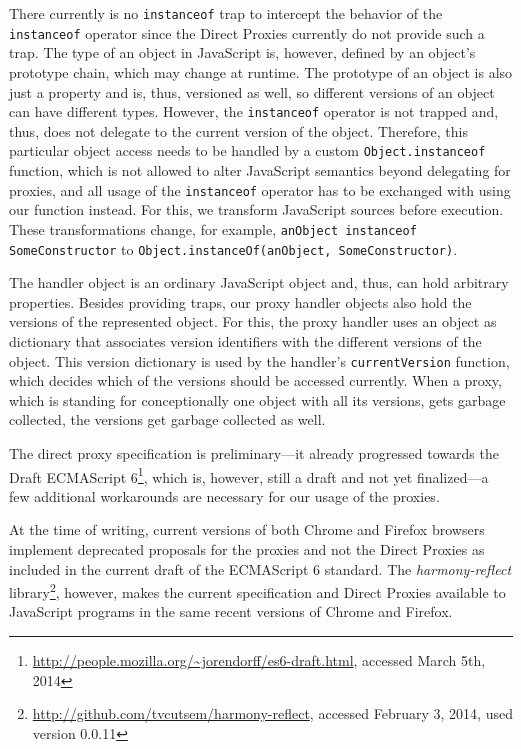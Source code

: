 There currently is no \lstinline{instanceof} trap to intercept the behavior of the \lstinline{instanceof} operator since the Direct Proxies currently do not provide such a trap.
The type of an object in JavaScript is, however, defined by an object's prototype chain, which may change at runtime.
The prototype of an object is also just a property and is, thus, versioned as well, so different versions of an object can have different types.
However, the \lstinline{instanceof} operator is not trapped and, thus, does not delegate to the current version of the object.
Therefore, this particular object access needs to be handled by a custom \lstinline{Object.instanceof} function, which is not allowed to alter JavaScript semantics beyond delegating for proxies, and all usage of the \lstinline{instanceof} operator has to be exchanged with using our function instead.
For this, we transform JavaScript sources before execution.
These transformations change, for example, \lstinline{anObject instanceof SomeConstructor} to \lstinline{Object.instanceOf(anObject, SomeConstructor)}.

The handler object is an ordinary JavaScript object and, thus, can hold arbitrary properties.
Besides providing traps, our proxy handler objects also hold the versions of the represented object.
For this, the proxy handler uses an object as dictionary that associates version identifiers with the different versions of the object.
This version dictionary is used by the handler's \lstinline{currentVersion} function, which decides which of the versions should be accessed currently.
When a proxy, which is standing for conceptionally one object with all its versions, gets garbage collected, the versions get garbage collected as well.


The direct proxy specification is preliminary---it already progressed towards the Draft ECMAScript 6\footnote{\url{http://people.mozilla.org/~jorendorff/es6-draft.html}, accessed March 5th, 2014}, which is, however, still a draft and not yet finalized---a few additional workarounds are necessary for our usage of the proxies.

At the time of writing, current versions of both Chrome and Firefox browsers implement deprecated proposals for the proxies and not the Direct Proxies as included in the current draft of the ECMAScript 6 standard.
The \emph{harmony-reflect} library\footnote{\url{http://github.com/tvcutsem/harmony-reflect}, accessed February 3, 2014, used version 0.0.11}, however, makes the current specification and Direct Proxies available to JavaScript programs in the same recent versions of Chrome and Firefox.

